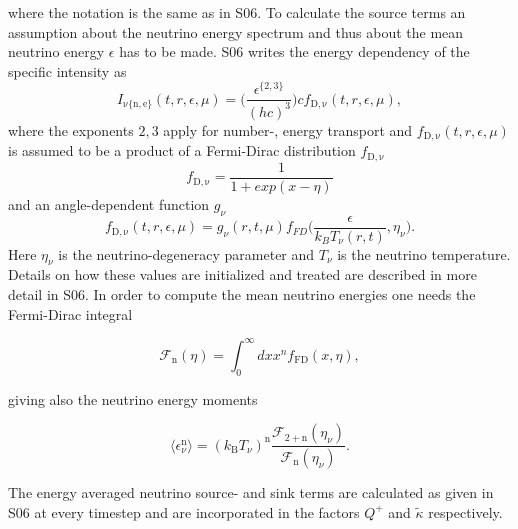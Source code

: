 \documentclass[fleqn,usenatbib]{mnras}
\begin{document}
where the notation is the same as in S06.
To calculate the source terms an assumption about the neutrino energy spectrum and thus about the mean neutrino energy $\epsilon$ has to be made. S06 writes the energy dependency of the specific intensity as
\begin{equation}
\label{equ:intensity}
I_{\mathrm{\nu\{n,e\}}}(t,r,\epsilon,\mu) = \Big(\frac{\epsilon^{\{2,3\}}}{(hc)^3} \Big) c f_{\mathrm{D,\nu}}(t, r, \epsilon, \mu),
\end{equation}
where the exponents $2,3$ apply for number-, energy transport and $f_{\mathrm{D,\nu}}(t, r, \epsilon, \mu)$ is assumed to be a product of a Fermi-Dirac distribution $f_{\mathrm{D,\nu}}$
\begin{equation}
\label{equ:fermi-dirac}
f_{\mathrm{D,\nu}} = \frac{1}{1+exp(x-\eta)}
\end{equation}
and an angle-dependent function $g_{\nu}$
\begin{equation}
\label{equ:fermi-dirac-g}
f_{\mathrm{D,\nu}}(t, r, \epsilon, \mu) = g_{\nu}(r,t,\mu)f_{FD}\Big( \frac{\epsilon}{k_B T_{\nu}(r,t)},\eta_{\nu} \Big).
\end{equation}
Here $\eta_{\nu}$ is the neutrino-degeneracy parameter and $T_{\nu}$ is the neutrino temperature. Details on how these values are initialized and treated are described in more detail in S06. In order to compute the mean neutrino energies one needs the Fermi-Dirac integral

\begin{equation}
\label{equ:fermi-dirac-integral}
\mathcal{F}_{\mathrm{n}}(\eta) = \int_0^{\infty}dx x^n f_{\mathrm{FD}}(x,\eta),
\end{equation}

giving also the neutrino energy moments

\begin{equation}
\label{equ:energy-moments}
\langle \epsilon^{\mathrm{n}}_{\nu} \rangle = (k_{\mathrm{B}} T_{\nu})^{\mathrm{n}} \frac{\mathcal{F}_{\mathrm{2+n}}(\eta_{\nu})}{\mathcal{F}_{\mathrm{n}}(\eta_{\nu})}.
\end{equation}

The energy averaged neutrino source- and sink terms are calculated as given in S06 at every timestep and are incorporated in the factors $Q^+$ and $\tilde{\kappa} $ respectively.
\fi
\end{document}
